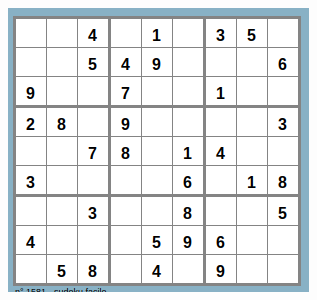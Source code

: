 \begin{figure}[H]
  \centering
  \includegraphics[width=0.6\linewidth]{4x6-equations/sudoku-9a.png}
\end{figure}


